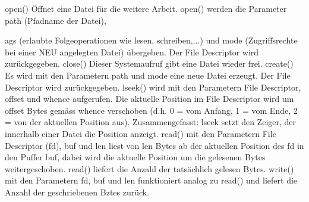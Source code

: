 \begin{answer}
open()
Öffnet eine Datei für die weitere Arbeit. open() werden die Parameter path (Pfadname der Datei),

ags (erlaubte Folgeoperationen wie lesen, schreiben,...) und mode (Zugriffsrechte bei einer NEU
angelegten Datei) übergeben. Der File Descriptor wird zurückgegeben.
close()
Dieser Systemaufruf gibt eine Datei wieder frei.
create()
Es wird mit den Parametern path und mode eine neue Datei erzeugt. Der File Descriptor wird
zurückgegeben.
lseek()
wird mit den Parametern File Descriptor, offset und whence aufgerufen. Die aktuelle Position im
File Descriptor wird um offset Bytes gemäss whence verschoben (d.h. 0 = vom Anfang, 1 = vom
Ende, 2 = von der aktuellen Position aus).
Zusammengefasst: lseek setzt den Zeiger, der innerhalb einer Datei die Position anzeigt.
read()
mit den Parametern File Descriptor (fd), buf und len liest von len Bytes ab der aktuellen Position
des fd in den Puffer buf, dabei wird die aktuelle Position um die gelesenen Bytes weitergeschoben.
read() liefert die Anzahl der tatsächlich gelesen Bytes.
write()
mit den Parametern fd, buf und len funktioniert analog zu read() und liefert die Anzahl der geschriebenen
Bztes zurück.
\end{answer}


